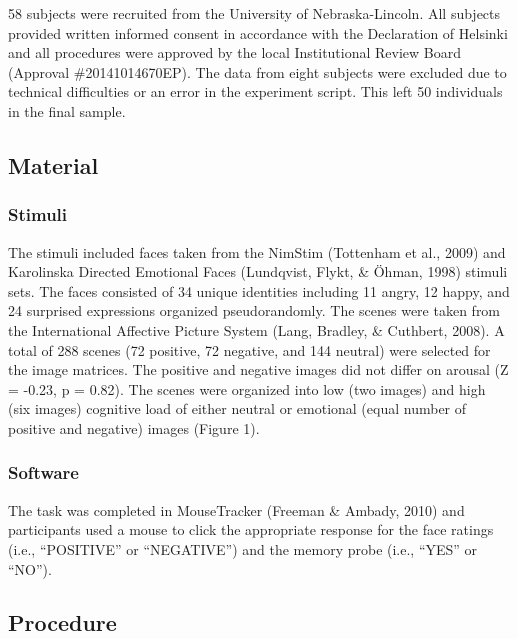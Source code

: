 \documentclass[man]{apa6}
\begin{document}
58 subjects were recruited from the University of Nebraska-Lincoln. All subjects provided written informed consent in accordance with the Declaration of Helsinki and all procedures were approved by the local Institutional Review Board (Approval \#20141014670EP). The data from eight subjects were excluded due to technical difficulties or an error in the experiment script. This left 50 individuals in the final sample.

\hypertarget{material}{%
\subsection{Material}\label{material}}

\hypertarget{stimuli}{%
\subsubsection{Stimuli}\label{stimuli}}

The stimuli included faces taken from the NimStim (Tottenham et al., 2009) and Karolinska Directed Emotional Faces (Lundqvist, Flykt, \& Öhman, 1998) stimuli sets. The faces consisted of 34 unique identities including 11 angry, 12 happy, and 24 surprised expressions organized pseudorandomly. The scenes were taken from the International Affective Picture System (Lang, Bradley, \& Cuthbert, 2008). A total of 288 scenes (72 positive, 72 negative, and 144 neutral) were selected for the image matrices. The positive and negative images did not differ on arousal (Z = -0.23, p = 0.82). The scenes were organized into low (two images) and high (six images) cognitive load of either neutral or emotional (equal number of positive and negative) images (Figure 1).

\hypertarget{software}{%
\subsubsection{Software}\label{software}}

The task was completed in MouseTracker (Freeman \& Ambady, 2010) and participants used a mouse to click the appropriate response for the face ratings (i.e., \enquote{POSITIVE} or \enquote{NEGATIVE}) and the memory probe (i.e., \enquote{YES} or \enquote{NO}).

\hypertarget{procedure}{%
\subsection{Procedure}\label{procedure}}
\end{document}

